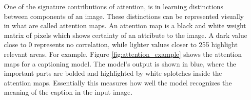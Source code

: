 \documentclass[letterpaper]{article} %
\begin{document}
%
%

One of the signature contributions of attention, is in learning distinctions 
between components of an image. These distinctions can be represented visually 
in what are called attention maps. An attention map is a black and white weight 
matrix of pixels which shows certainty of an attribute to the image. A dark 
value close to 0 represents no correlation, while lighter values closer to 255 
highlight relevant areas. For example, Figure \ref{fig:attention_example} shows 
the attention maps for a captioning model. The model's output is shown in blue, 
where the important parts are bolded and highlighted by white splotches inside 
the attention maps. Essentially this measures how well the model recognizes the 
meaning of the caption in the input image.
\end{document}
